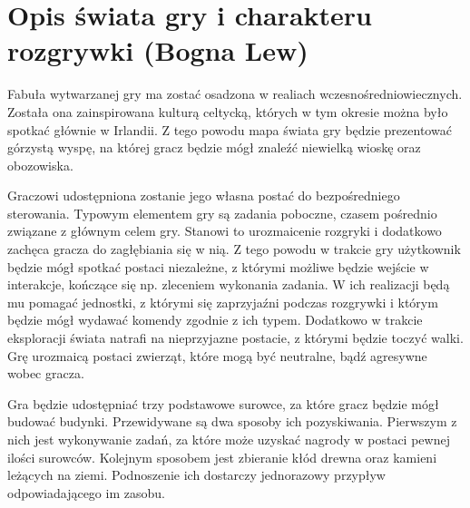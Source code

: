 \section{Opis świata gry i charakteru rozgrywki (Bogna Lew)}
Fabuła wytwarzanej gry ma zostać osadzona w realiach wczesnośredniowiecznych. Została ona zainspirowana kulturą celtycką, których
w tym okresie można było spotkać głównie w Irlandii. Z tego powodu mapa świata gry będzie prezentować górzystą wyspę, na
której gracz będzie mógł znaleźć niewielką wioskę oraz obozowiska.

Graczowi udostępniona zostanie jego własna postać do bezpośredniego sterowania. Typowym elementem gry są zadania
poboczne, czasem pośrednio związane z głównym celem gry. Stanowi to urozmaicenie rozgryki i dodatkowo zachęca gracza do
zagłębiania się w nią. Z tego powodu w trakcie gry użytkownik będzie mógł spotkać postaci niezależne, z którymi możliwe
będzie wejście w interakcje, kończące się np. zleceniem wykonania zadania. W ich realizacji będą mu pomagać jednostki,
z którymi się zaprzyjaźni podczas rozgrywki i którym będzie mógł wydawać komendy zgodnie z ich typem. Dodatkowo w
trakcie eksploracji świata natrafi na nieprzyjazne postacie, z którymi będzie toczyć walki. Grę urozmaicą postaci
zwierząt, które mogą być neutralne, bądź agresywne wobec gracza.

Gra będzie udostępniać trzy podstawowe surowce, za które gracz będzie mógł budować budynki. Przewidywane są dwa sposoby
ich pozyskiwania. Pierwszym z nich jest wykonywanie zadań, za które może uzyskać nagrody w postaci pewnej ilości
surowców. Kolejnym sposobem jest zbieranie kłód drewna oraz kamieni leżących na ziemi. Podnoszenie ich dostarczy
jednorazowy przypływ odpowiadającego im zasobu.
